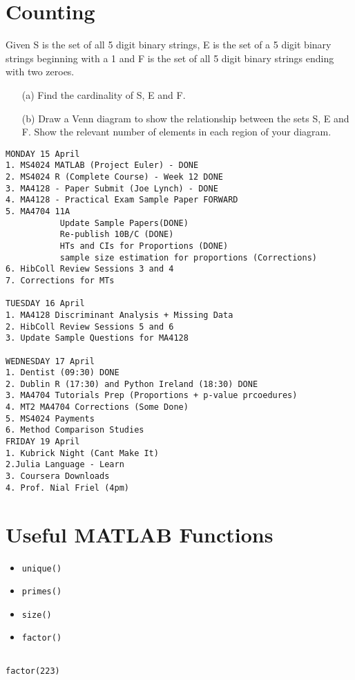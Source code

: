 \documentclass[12pt]{article} %
\begin{document}
\section{Counting}
Given S is the set of all 5 digit binary strings, E is the set of a 5 digit
binary strings beginning with a 1 and F is the set of all 5 digit binary strings ending
with two zeroes.
\begin{itemize}
\item[(a)] Find the cardinality of S, E and F.
\item[(b)] Draw a Venn diagram to show the relationship between the sets S, E and F.
Show the relevant number of elements in each region of your diagram.
\end{itemize}
\newpage
\newpage
\begin{verbatim}
MONDAY 15 April
1. MS4024 MATLAB (Project Euler) - DONE
2. MS4024 R (Complete Course) - Week 12 DONE
3. MA4128 - Paper Submit (Joe Lynch) - DONE
4. MA4128 - Practical Exam Sample Paper FORWARD
5. MA4704 11A
           Update Sample Papers(DONE)
           Re-publish 10B/C (DONE)
           HTs and CIs for Proportions (DONE)
           sample size estimation for proportions (Corrections)
6. HibColl Review Sessions 3 and 4
7. Corrections for MTs

TUESDAY 16 April
1. MA4128 Discriminant Analysis + Missing Data 
2. HibColl Review Sessions 5 and 6
3. Update Sample Questions for MA4128

WEDNESDAY 17 April
1. Dentist (09:30) DONE
2. Dublin R (17:30) and Python Ireland (18:30) DONE
3. MA4704 Tutorials Prep (Proportions + p-value prcoedures)
4. MT2 MA4704 Corrections (Some Done)
5. MS4024 Payments
6. Method Comparison Studies
FRIDAY 19 April
1. Kubrick Night (Cant Make It)
2.Julia Language - Learn
3. Coursera Downloads
4. Prof. Nial Friel (4pm)
\end{verbatim}
\newpage
\section{Useful MATLAB Functions}

\begin{itemize}
\item \texttt{unique()}
\item \texttt{primes()}
\item \texttt{size()}
\item \texttt{factor()}
\end{itemize}
\begin{framed}
\begin{verbatim}

factor(223)

\end{verbatim}
\end{framed}
\end{document}
